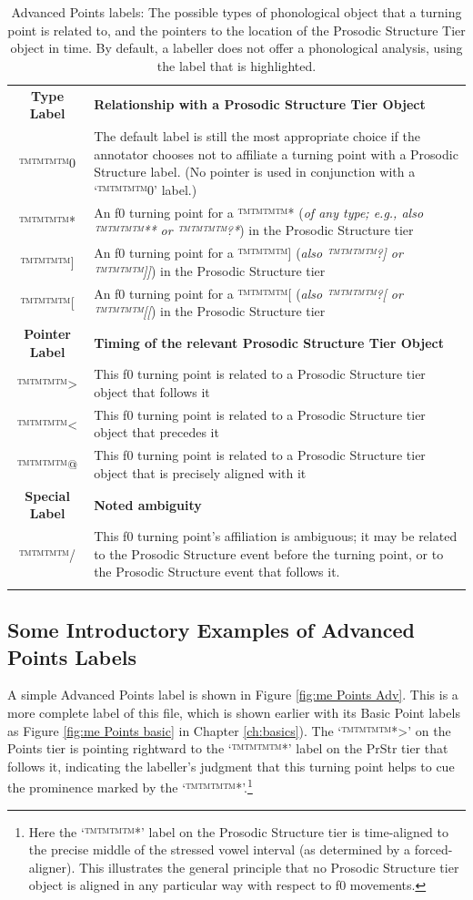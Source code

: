 \documentclass[11pt, twoside]{memoir}
\begin{document}
\begin{longtable}{cp{.8\linewidth}}
\toprule
\textbf{Type Label} & \textbf{Relationship with a Prosodic Structure Tier Object}\tabularnewline\hdashline
™™™™{0} & The default label is still the most appropriate choice if the annotator chooses not to affiliate a turning point with a Prosodic Structure label. (No pointer is used in conjunction with a ‘™™™™{0}’ label.) \tabularnewline\hdashline
™™™™{*} & An f0 turning point for a ™™™™{*} (\textit{of any type; e.g., also ™™™™{**} or ™™™™{?*}}) in the Prosodic Structure tier \tabularnewline\hdashline
™™™™{]} & An f0 turning point for a ™™™™{]} (\textit{also ™™™™{?]} or ™™™™{]]}}) in the Prosodic Structure tier \tabularnewline\hdashline
™™™™{[} & An f0 turning point for a ™™™™{[} (\textit{also ™™™™{?[} or ™™™™{[[}}) in the Prosodic Structure tier \tabularnewline
\midrule
\textbf{Pointer Label} & \textbf{Timing of the relevant Prosodic Structure Tier Object}\tabularnewline\hdashline
™™™™{>{}} & This f0 turning point is related to a Prosodic Structure tier object that follows it \tabularnewline\hdashline
™™™™{<{}} & This f0 turning point is related to a Prosodic Structure tier object that precedes it \tabularnewline\hdashline
™™™™{@} & This f0 turning point is related to a Prosodic Structure tier object that is precisely aligned with it \tabularnewline
\midrule
\textbf{Special Label} & \textbf{Noted ambiguity} \tabularnewline\hdashline
™™™™{/} & This f0 turning point’s affiliation is ambiguous; it may be related to the Prosodic Structure event before the turning point, or to the Prosodic Structure event that follows it. \tabularnewline
\bottomrule
\caption[Advanced Points labels]{Advanced Points labels: The possible types of phonological object that a turning point is related to, and the pointers to the location of the Prosodic Structure Tier object in time. By default, a labeller does not offer a phonological analysis, using the label that is highlighted.}
\end{longtable}

\subsection{Some Introductory Examples of Advanced Points Labels}\label{sec:some-first-examples-of-advanced-points-labels}

A simple Advanced Points label is shown in Figure \ref{fig:me Points Adv}. This is a more complete label of this file, which is shown earlier with its Basic Point labels as Figure \ref{fig:me Points basic} in Chapter \ref{ch:basics}). The ‘™™™™{*>}’ on the Points tier is pointing rightward to the ‘™™™™{*}’ label on the PrStr tier that follows it, indicating the labeller’s judgment that this turning point helps to cue the prominence marked by the ‘™™™™{*}’.\footnote{Here the ‘™™™™{*}’ label on the Prosodic Structure tier is time-aligned to the precise middle of the stressed vowel interval (as determined by a forced-aligner). This illustrates the general principle that no Prosodic Structure tier object is aligned in any particular way with respect to f0 movements.}
\end{document}
